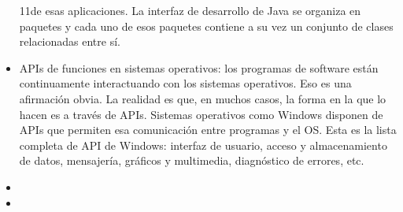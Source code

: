 \begin{itemize}
11de esas aplicaciones. La interfaz de desarrollo de Java se organiza en paquetes y cada uno de esos paquetes contiene a su vez un conjunto de clases relacionadas entre sí.
  \item APIs de funciones en sistemas operativos: los programas de software están continuamente interactuando con los sistemas operativos. Eso es una afirmación obvia. La realidad es que, en muchos casos, la forma en la que lo hacen es a través de APIs. Sistemas operativos como Windows disponen de APIs que permiten esa comunicación entre programas y el OS. Esta es la lista completa de API de Windows: interfaz de usuario, acceso y almacenamiento de datos, mensajería, gráficos y multimedia, diagnóstico de errores, etc.
  \item
  \item
\end{itemize}
